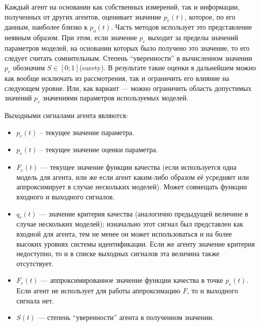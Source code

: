 Каждый агент на основании как собственных измерений, так и информации,
полученных от других агентов, оценивает значение $p_e(t)$,
которое, по его данным, наиболее близко к $p_o(t)$.
Часть методов использует это представление неявным образом.
При этом, если значение $p_e$ выходит за пределы
значений параметров моделей, на основании которых
было получено это значение, то его следует считать сомнительным.
Степень ``уверенности'' в вычисленном значении $p_e$
обозначим $S \in [0;1]$\label{atu:d:S}(surety).
В результате такие оценки в дальнейшем можно
как вообще исключать из рассмотрения, так и ограничить
его влияние на следующем уровне.
Или, как вариант --- можно ограничить область допустимых
значений $p_e$ значениями параметров используемых моделей.

Выходными сигналами агента являются:\label{atu:d:agent_out_list}

\begin{itemize}

  \item
    $p_c(t)$ -- текущее значение параметра.

  \item
    $p_e(t)$ -- текущее значение оценки параметра.

  \item
    $F_c(t)$ --- текущее значение функции качества
    (если используется одна  модель для агента, или же если агент каким-либо образом её усредняет
    или аппроксимирует в случае нескольких моделей).
    Может совмещать функции входного и выходного сигналов.

  \item
    $q_c(t)$ --- значение критерия качества (аналогично предыдущей величине в случае нескольких моделей);
    изначально этот сигнал был представлен как входной для агента, тем не менее
    он может использоваться и на более высоких уровнях системы идентификации.
    Если же агенту значение критерия недоступно, то и в списке выходных сигналов эта величина
    также отсутствует.

  \item
    $F_e(t)$ --- аппроксимированное значение функции качества
    в точке $p_e(t)$. Если агент не использует для работы аппроксимацию
    $F$, то и выходного сигнала нет.

  \item
    $S(t)$ --- степень ``уверенности'' агента в полученном значении.

\end{itemize}


